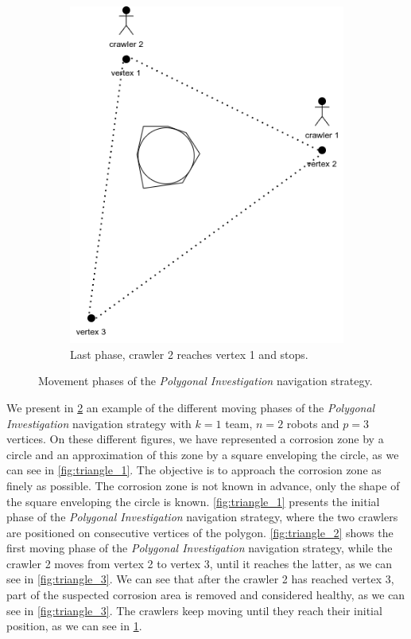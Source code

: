 \begin{figure}[h!]
\begin{subfigure}[t]{0.27\linewidth}
		\includegraphics[width=\linewidth]{graphics/triangle_7.png}
		\caption{Last phase, crawler 2 reaches vertex 1 and stops.}
		\label{fig:triangle_7}
	\end{subfigure}
		\caption{Movement phases of the \textit{Polygonal Investigation} navigation strategy.}
		\label{fig:triangle}
\end{figure}

We present in \ref{fig:triangle} an example of the different moving phases of the \textit{Polygonal Investigation} navigation strategy with $k = 1$ team, $n = 2$ robots and $p = 3$ vertices.
On these different figures, we have represented a corrosion zone by a circle and an approximation of this zone by a square enveloping the circle, as we can see in \ref{fig:triangle_1}.
The objective is to approach the corrosion zone as finely as possible.
The corrosion zone is not known in advance, only the shape of the square enveloping the circle is known.
\ref{fig:triangle_1} presents the initial phase of the \textit{Polygonal Investigation} navigation strategy, where the two crawlers are positioned on consecutive vertices of the polygon.
\ref{fig:triangle_2} shows the first moving phase of the \textit{Polygonal Investigation} navigation strategy, while the crawler 2 moves from vertex 2 to vertex 3, until it reaches the latter, as we can see in \ref{fig:triangle_3}.
We can see that after the crawler 2 has reached vertex 3, part of the suspected corrosion area is removed and considered healthy, as we can see in \ref{fig:triangle_3}.
The crawlers keep moving until they reach their initial position, as we can see in \ref{fig:triangle_7}.

